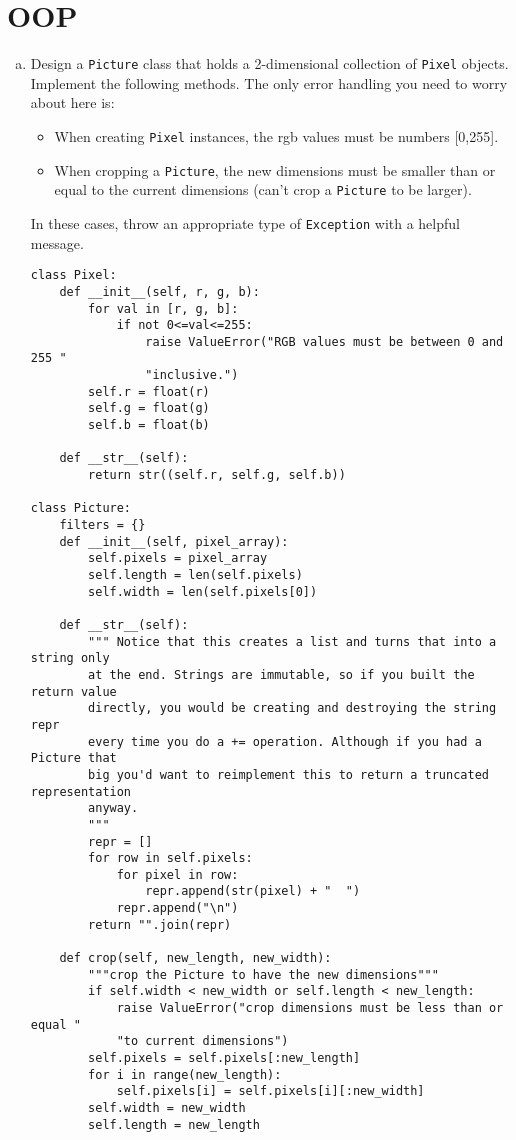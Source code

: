 \documentclass[11pt]{article}
\begin{document}
\section{OOP}
\begin{enumerate}[a)]
\item Design a \texttt{Picture} class that holds a 2-dimensional collection of \texttt{Pixel} objects. Implement the following methods. The only error handling you need to worry about here is:
\begin{itemize}
\item When creating \texttt{Pixel} instances, the rgb values must be numbers [0,255].
\item When cropping a \texttt{Picture}, the new dimensions must be smaller than or equal to the current dimensions (can't crop a \texttt{Picture} to be larger).
\end{itemize}
In these cases, throw an appropriate type of \texttt{Exception} with a helpful message.
\begin{verbatim}
class Pixel:
    def __init__(self, r, g, b):
        for val in [r, g, b]:
            if not 0<=val<=255:
                raise ValueError("RGB values must be between 0 and 255 " 
                "inclusive.")
        self.r = float(r)
        self.g = float(g)
        self.b = float(b)

    def __str__(self):
        return str((self.r, self.g, self.b))

class Picture:
    filters = {}
    def __init__(self, pixel_array):
        self.pixels = pixel_array
        self.length = len(self.pixels)
        self.width = len(self.pixels[0])

    def __str__(self):
        """ Notice that this creates a list and turns that into a string only 
        at the end. Strings are immutable, so if you built the return value
        directly, you would be creating and destroying the string repr
        every time you do a += operation. Although if you had a Picture that
        big you'd want to reimplement this to return a truncated representation
        anyway. 
        """
        repr = []
        for row in self.pixels:
            for pixel in row:
                repr.append(str(pixel) + "  ")
            repr.append("\n")
        return "".join(repr)

    def crop(self, new_length, new_width):
        """crop the Picture to have the new dimensions"""
        if self.width < new_width or self.length < new_length:
            raise ValueError("crop dimensions must be less than or equal "
            "to current dimensions")
        self.pixels = self.pixels[:new_length]
        for i in range(new_length):
            self.pixels[i] = self.pixels[i][:new_width]
        self.width = new_width
        self.length = new_length


\end{verbatim}
\end{enumerate}
\end{document}
